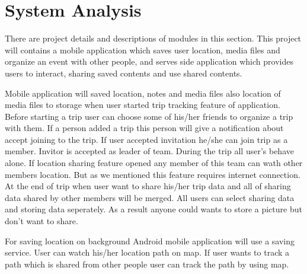 \chapter{System Analysis}
There are project details and descriptions of modules in this section.
This project will contains a mobile application which saves user location, media files and organize an event with other people, and serves side application which provides users to interact, sharing saved contents and use shared contents. 

Mobile application will saved location, notes and media files also location of media files to storage when user started trip tracking feature of application. Before starting a trip user can choose some of his/her friends to organize a trip with them. If a person added a trip this person will give a notification about accept joining to the trip. If user accepted invitation he/she can join trip as a member. Invitor is accepted as leader of team. During the trip all user's behave alone. If location sharing feature opened any member of this team can wath other members location. But as we mentioned this feature requires internet connection. At the end of trip when user want to share his/her trip data and all of sharing data shared by other members will be merged. All users can select sharing data and storing data seperately. As a result anyone could wants to store a picture but don't want to share. 

For saving location on background Android mobile application will use a saving service. User can watch his/her location path on map. If user wants to track a path which is shared from other people user can track the path by using map. 

 